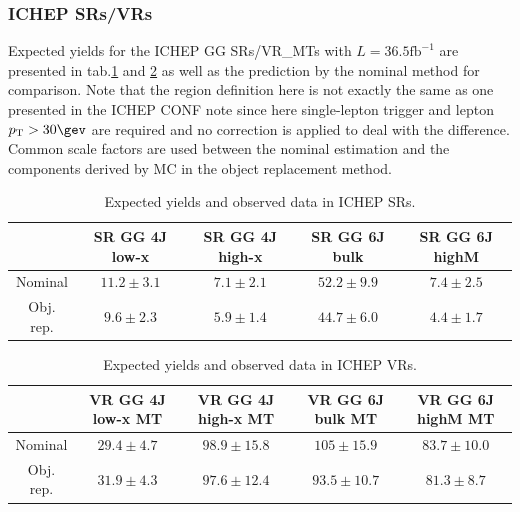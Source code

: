 \subsubsection{ICHEP SRs/VRs} \label{sec::ObjReplace::result::ICHEP}
Expected yields for the ICHEP GG SRs/VR\_MTs with $L=36.5 \mathrm{fb}^{-1}$ are presented in tab.\ref{tab::ObjReplace::result::resultSR_ICHEP} and \ref{tab::ObjReplace::result::resultVR_ICHEP} as well as the prediction by the nominal method for comparison. Note that the region definition here is not exactly the same as one presented in the ICHEP CONF note since here single-lepton trigger and lepton $p_{\mathrm{T}}>30\gev$ are required and no correction is applied to deal with the difference. Common scale factors are used between the nominal estimation and the components derived by MC in the object replacement method.

\begin{table}[h]
  \begin{center}
    \caption{Expected yields and observed data in ICHEP SRs.}
    \begin{tabular}{ | c | c | c | c | c | }
      \hline                           
      & SR GG 4J low-x      &  SR GG 4J high-x     &  SR GG 6J bulk     &  SR GG 6J highM  \\
      \hline
      Nominal   
      & $11.2\pm3.1$ & $7.1\pm2.1$ & $52.2\pm9.9$ & $7.4\pm2.5$  \\
      \hline
      Obj. rep.
      & $9.6\pm2.3$ & $5.9\pm1.4$ & $44.7\pm6.0$ & $4.4\pm1.7$  \\
      \hline
    \end{tabular}  \label{tab::ObjReplace::result::resultSR_ICHEP}
  \end{center}
\end{table}


\begin{table}[h]
  \begin{center}
    \caption{Expected yields and observed data in ICHEP VRs.}
    \begin{tabular}{ | c | c | c | c | c | }
      \hline                           
      & VR GG 4J low-x MT   &  VR GG 4J high-x MT  &  VR GG 6J bulk MT  &  VR GG 6J highM MT\\
      \hline
      Nominal   
      & $29.4\pm4.7$ & $98.9\pm15.8$ & $105\pm15.9$ & $83.7\pm10.0$    \\
      \hline
      Obj. rep. 
      & $31.9\pm4.3$ & $97.6\pm12.4$ & $93.5\pm10.7$ & $81.3\pm8.7$     \\
      \hline
    \end{tabular}  \label{tab::ObjReplace::result::resultVR_ICHEP}
  \end{center}
\end{table}


